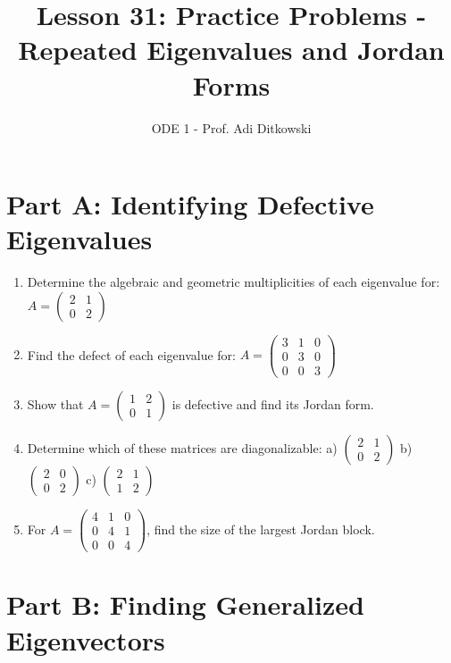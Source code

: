 \documentclass[12pt]{article}
\title{Lesson 31: Practice Problems - Repeated Eigenvalues and Jordan Forms}
\author{ODE 1 - Prof. Adi Ditkowski}
\date{}
\begin{document}
\maketitle

\section*{Part A: Identifying Defective Eigenvalues}

\begin{enumerate}
\item Determine the algebraic and geometric multiplicities of each eigenvalue for:
$A = \begin{pmatrix} 2 & 1 \\ 0 & 2 \end{pmatrix}$

\item Find the defect of each eigenvalue for:
$A = \begin{pmatrix} 3 & 1 & 0 \\ 0 & 3 & 0 \\ 0 & 0 & 3 \end{pmatrix}$

\item Show that $A = \begin{pmatrix} 1 & 2 \\ 0 & 1 \end{pmatrix}$ is defective and find its Jordan form.

\item Determine which of these matrices are diagonalizable:
a) $\begin{pmatrix} 2 & 1 \\ 0 & 2 \end{pmatrix}$
b) $\begin{pmatrix} 2 & 0 \\ 0 & 2 \end{pmatrix}$
c) $\begin{pmatrix} 2 & 1 \\ 1 & 2 \end{pmatrix}$

\item For $A = \begin{pmatrix} 4 & 1 & 0 \\ 0 & 4 & 1 \\ 0 & 0 & 4 \end{pmatrix}$, find the size of the largest Jordan block.
\end{enumerate}

\section*{Part B: Finding Generalized Eigenvectors}
\end{document}

